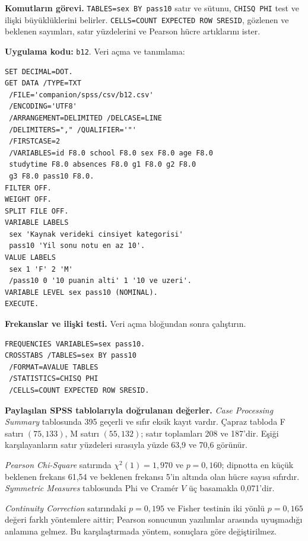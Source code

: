 {\raggedright
\noindent\textbf{Komutların görevi.} \texttt{TABLES=sex BY pass10}
satır ve sütunu, \texttt{CHISQ PHI} test ve ilişki büyüklüklerini
belirler. \texttt{CELLS=COUNT EXPECTED ROW SRESID}, gözlenen ve
beklenen sayımları, satır yüzdelerini ve Pearson hücre artıklarını
ister.\par}

\par\noindent\begin{minipage}{\linewidth}
\textbf{Uygulama kodu:} \texttt{b12}. Veri açma ve tanımlama:

\begin{lstlisting}[style=prismSPSS]
SET DECIMAL=DOT.
GET DATA /TYPE=TXT
 /FILE='companion/spss/csv/b12.csv'
 /ENCODING='UTF8'
 /ARRANGEMENT=DELIMITED /DELCASE=LINE
 /DELIMITERS="," /QUALIFIER='"'
 /FIRSTCASE=2
 /VARIABLES=id F8.0 school F8.0 sex F8.0 age F8.0
 studytime F8.0 absences F8.0 g1 F8.0 g2 F8.0
 g3 F8.0 pass10 F8.0.
FILTER OFF.
WEIGHT OFF.
SPLIT FILE OFF.
VARIABLE LABELS
 sex 'Kaynak verideki cinsiyet kategorisi'
 pass10 'Yil sonu notu en az 10'.
VALUE LABELS
 sex 1 'F' 2 'M'
 /pass10 0 '10 puanin alti' 1 '10 ve uzeri'.
VARIABLE LEVEL sex pass10 (NOMINAL).
EXECUTE.
\end{lstlisting}
\end{minipage}\par

\par\noindent\begin{minipage}{\linewidth}
\textbf{Frekanslar ve ilişki testi.} Veri açma bloğundan sonra çalıştırın.

\begin{lstlisting}[style=prismSPSS]
FREQUENCIES VARIABLES=sex pass10.
CROSSTABS /TABLES=sex BY pass10
 /FORMAT=AVALUE TABLES
 /STATISTICS=CHISQ PHI
 /CELLS=COUNT EXPECTED ROW SRESID.
\end{lstlisting}
\end{minipage}\par

\begin{outputguidebox}
\textbf{Paylaşılan SPSS tablolarıyla doğrulanan değerler.}
\emph{Case Processing Summary} tablosunda 395 geçerli ve sıfır
eksik kayıt vardır. Çapraz tabloda F satırı $(75,133)$, M satırı
$(55,132)$; satır toplamları 208 ve 187'dir. Eşiği karşılayanların
satır yüzdeleri sırasıyla yüzde 63,9 ve 70,6 görünür.

\emph{Pearson Chi-Square} satırında $\chi^2(1)=1{,}970$ ve
$p=0{,}160$; dipnotta en küçük beklenen frekans 61,54 ve beklenen
frekansı 5'in altında olan hücre sayısı sıfırdır. \emph{Symmetric
Measures} tablosunda Phi ve Cramér $V$ üç basamakla 0,071'dir.

\emph{Continuity Correction} satırındaki $p=0{,}195$ ve Fisher
testinin iki yönlü $p=0{,}165$ değeri farklı yöntemlere aittir;
Pearson sonucunun yazılımlar arasında uyuşmadığı anlamına gelmez.
Bu karşılaştırmada yöntem, sonuçlara göre değiştirilmez.
\end{outputguidebox}

